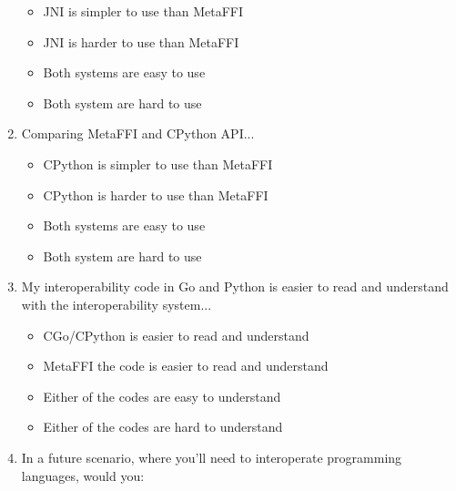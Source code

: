 \documentclass[sigplan,10pt,manuscript,nonacm]{acmart}
\begin{document}
\begin{enumerate}
    \begin{itemize}
        \vspace{-2mm}\item JNI is simpler to use than MetaFFI
        \vspace{-2mm}\item JNI is harder to use than MetaFFI
        \vspace{-2mm}\item Both systems are easy to use
        \vspace{-2mm}\item Both system are hard to use
    \end{itemize}
    \vspace{-2mm}\item Comparing MetaFFI and CPython API...
    \begin{itemize}
        \vspace{-2mm}\item CPython is simpler to use than MetaFFI
        \vspace{-2mm}\item CPython is harder to use than MetaFFI
        \vspace{-2mm}\item Both systems are easy to use
        \vspace{-2mm}\item Both system are hard to use
    \end{itemize}
    \vspace{-2mm}\item My interoperability code in Go and Python is easier to read and understand with the interoperability system...
    \begin{itemize}
        \vspace{-2mm}\item CGo/CPython is easier to read and understand
        \vspace{-2mm}\item MetaFFI the code is easier to read and understand
        \vspace{-2mm}\item Either of the codes are easy to understand
        \vspace{-2mm}\item Either of the codes are hard to understand
    \end{itemize}
    \vspace{-2mm}\item In a future scenario, where you'll need to interoperate programming languages, would you:

\end{enumerate}
\end{document}
